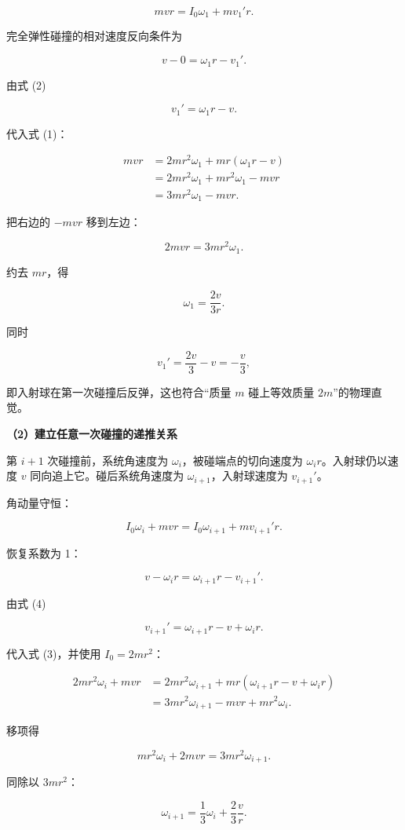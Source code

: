 \documentclass[12pt,a4paper,UTF8]{ctexart}
\begin{document}
\[
mvr=I_0\omega_1+mv_1'r. \tag{1}
\]

完全弹性碰撞的相对速度反向条件为

\[
v-0=\omega_1r-v_1'. \tag{2}
\]

由式 (2)

\[v_1'=\omega_1r-v.\]

代入式 (1)：

\[
\begin{aligned}
mvr
&=2mr^2\omega_1+mr(\omega_1r-v)\\
&=2mr^2\omega_1+mr^2\omega_1-mvr\\
&=3mr^2\omega_1-mvr.
\end{aligned}
\]

把右边的 \(-mvr\) 移到左边：

\[2mvr=3mr^2\omega_1.\]

约去 \(mr\)，得

\[
\boxed{\omega_1=\frac{2v}{3r}}.
\]

同时

\[
v_1'=\frac{2v}{3}-v=-\frac v3,
\]

即入射球在第一次碰撞后反弹，这也符合``质量 \(m\) 碰上等效质量
\(2m\)''的物理直觉。

\textbf{（2）建立任意一次碰撞的递推关系}

第 \(i+1\) 次碰撞前，系统角速度为 \(\omega_i\)，被碰端点的切向速度为
\(\omega_i r\)。入射球仍以速度 \(v\) 同向追上它。碰后系统角速度为
\(\omega_{i+1}\)，入射球速度为 \(v_{i+1}'\)。

角动量守恒：

\[
I_0\omega_i+mvr=I_0\omega_{i+1}+mv_{i+1}'r. \tag{3}
\]

恢复系数为 1：

\[
v-\omega_i r=\omega_{i+1}r-v_{i+1}'. \tag{4}
\]

由式 (4)

\[
v_{i+1}'=\omega_{i+1}r-v+\omega_i r.
\]

代入式 (3)，并使用 \(I_0=2mr^2\)：

\[
\begin{aligned}
2mr^2\omega_i+mvr
&=2mr^2\omega_{i+1}
+mr(\omega_{i+1}r-v+\omega_i r)\\
&=3mr^2\omega_{i+1}-mvr+mr^2\omega_i.
\end{aligned}
\]

移项得

\[
mr^2\omega_i+2mvr=3mr^2\omega_{i+1}.
\]

同除以 \(3mr^2\)：

\[
\boxed{\omega_{i+1}=\frac13\omega_i+\frac23\frac vr}. \tag{5}
\]
\end{document}
